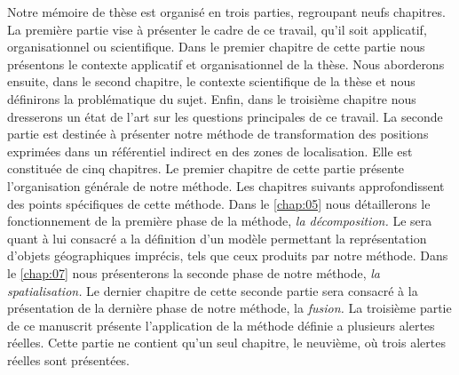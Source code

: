 
Notre mémoire de thèse est organisé en trois parties, regroupant neufs
chapitres. La première partie vise à présenter le cadre de ce travail,
qu'il soit applicatif, organisationnel ou scientifique.  Dans le
premier chapitre de cette partie nous présentons le contexte
applicatif et organisationnel de la thèse. Nous aborderons ensuite,
dans le second chapitre, le contexte scientifique de la thèse et nous
définirons la problématique du sujet. Enfin, dans le troisième
chapitre nous dresserons un état de l'art sur les questions
principales de ce travail.
%
La seconde partie est destinée à présenter notre méthode de
transformation des positions exprimées dans un référentiel indirect en
des zones de localisation. Elle est constituée de cinq chapitres. Le
premier chapitre de cette partie présente l’organisation générale de
notre méthode. Les chapitres suivants approfondissent des points
spécifiques de cette méthode. Dans le \autoref{chap:05} nous
détaillerons le fonctionnement de la première phase de la méthode,
\emph{la décomposition.} Le  sera quant à lui
consacré a la définition d'un modèle permettant la représentation
d'objets géographiques imprécis, tels que ceux produits par notre
méthode. Dans le \autoref{chap:07} nous présenterons la seconde phase
de notre méthode, \emph{la spatialisation.} Le dernier chapitre de
cette seconde partie sera consacré à la présentation de la dernière
phase de notre méthode, la \emph{fusion.}
%
La troisième partie de ce manuscrit présente l’application de la
méthode définie a plusieurs alertes réelles. Cette partie ne contient
qu'un seul chapitre, le neuvième, où trois alertes réelles sont
présentées.

